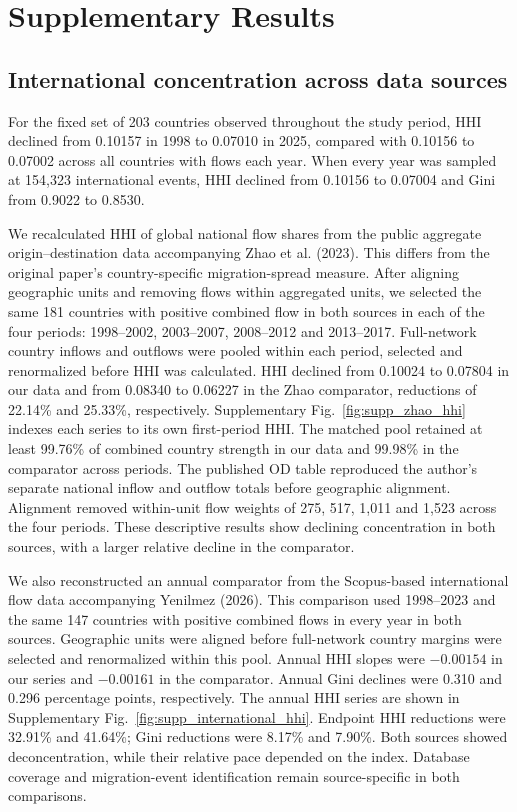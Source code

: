 \clearpage
\begingroup
\renewcommand{\thesubsection}{S\arabic{subsection}}
\setcounter{subsection}{0}
\section*{Supplementary Results}

\subsection{International concentration across data sources}
\label{supp:international_sources}

For the fixed set of 203 countries observed throughout the study period, HHI declined from 0.10157 in 1998 to 0.07010 in 2025, compared with 0.10156 to 0.07002 across all countries with flows each year. When every year was sampled at 154,323 international events, HHI declined from 0.10156 to 0.07004 and Gini from 0.9022 to 0.8530.

We recalculated HHI of global national flow shares from the public aggregate origin--destination data accompanying Zhao et al. (2023)\cite{ref039}. This differs from the original paper's country-specific migration-spread measure. After aligning geographic units and removing flows within aggregated units, we selected the same 181 countries with positive combined flow in both sources in each of the four periods: 1998--2002, 2003--2007, 2008--2012 and 2013--2017. Full-network country inflows and outflows were pooled within each period, selected and renormalized before HHI was calculated. HHI declined from 0.10024 to 0.07804 in our data and from 0.08340 to 0.06227 in the Zhao comparator, reductions of 22.14\% and 25.33\%, respectively. Supplementary Fig.~\ref{fig:supp_zhao_hhi} indexes each series to its own first-period HHI. The matched pool retained at least 99.76\% of combined country strength in our data and 99.98\% in the comparator across periods. The published OD table reproduced the author's separate national inflow and outflow totals before geographic alignment. Alignment removed within-unit flow weights of 275, 517, 1,011 and 1,523 across the four periods. These descriptive results show declining concentration in both sources, with a larger relative decline in the comparator.

We also reconstructed an annual comparator from the Scopus-based international flow data accompanying Yenilmez (2026)\cite{yenilmez2026}. This comparison used 1998--2023 and the same 147 countries with positive combined flows in every year in both sources. Geographic units were aligned before full-network country margins were selected and renormalized within this pool. Annual HHI slopes were $-0.00154$ in our series and $-0.00161$ in the comparator. Annual Gini declines were 0.310 and 0.296 percentage points, respectively. The annual HHI series are shown in Supplementary Fig.~\ref{fig:supp_international_hhi}. Endpoint HHI reductions were 32.91\% and 41.64\%; Gini reductions were 8.17\% and 7.90\%. Both sources showed deconcentration, while their relative pace depended on the index. Database coverage and migration-event identification remain source-specific in both comparisons.

